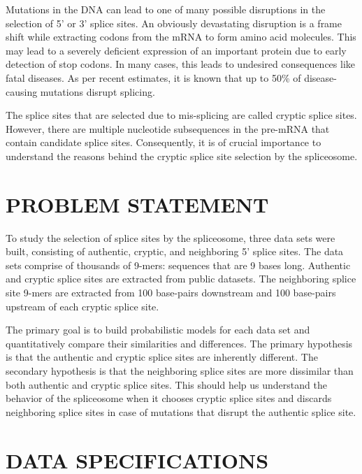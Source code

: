 \documentclass[12pt,a4paper]{article}
\begin{document}
	Mutations in the DNA can lead to one of many possible disruptions in the selection of 5’ or 3’ splice sites. An obviously devastating disruption is a frame shift while extracting codons from the mRNA to form amino acid molecules. This may lead to a severely deficient expression of an important protein due to early detection of stop codons. In many cases, this leads to undesired consequences like fatal diseases. As per recent estimates, it is known that up to 50\% of disease-causing mutations disrupt splicing. \par
	The splice sites that are selected due to mis-splicing are called cryptic splice sites. However, there are multiple nucleotide subsequences in the pre-mRNA that contain candidate splice sites. Consequently, it is of crucial importance to understand the reasons behind the cryptic splice site selection by the spliceosome.
	

	\section{\large PROBLEM STATEMENT} \label{sec:problem}
	To study the selection of splice sites by the spliceosome, three data sets were built, consisting of authentic, cryptic, and neighboring 5’ splice sites. The data sets comprise of thousands of 9-mers: sequences that are 9 bases long. Authentic and cryptic splice sites are extracted from public datasets. The neighboring splice site 9-mers are extracted from 100 base-pairs downstream and 100 base-pairs upstream of each cryptic splice site. \par
	The primary goal is to build probabilistic models for each data set and quantitatively compare their similarities and differences. The primary hypothesis is that the authentic and cryptic splice sites are inherently different. The secondary hypothesis is that the neighboring splice sites are more dissimilar than both authentic and cryptic splice sites. This should help us understand the behavior of the spliceosome when it chooses cryptic splice sites and discards neighboring splice sites in case of mutations that disrupt the authentic splice site.
    
    \section{DATA SPECIFICATIONS} \label{sec-dataspec}
\end{document}
